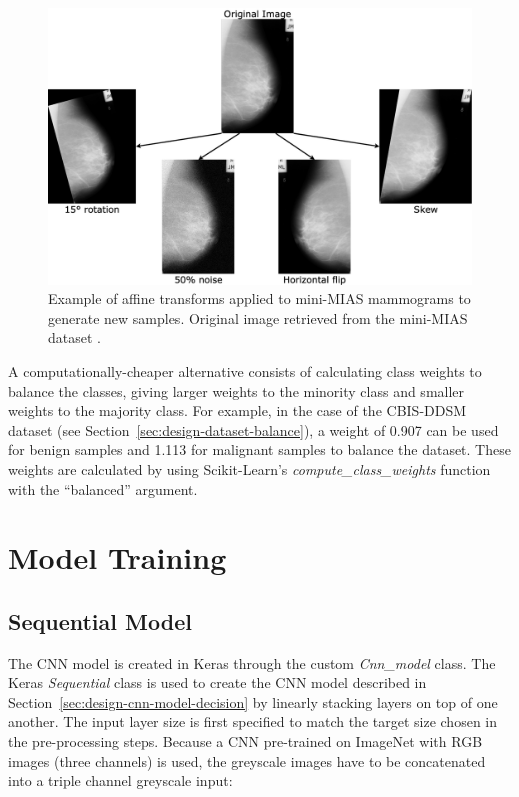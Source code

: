 \begin{figure}[h]
\centerline{\includegraphics[width=\textwidth]{figures/implementation/Data augmentation transforms.png}}
\caption{\label{fig:implementation-Data augmentation transforms}Example of affine transforms applied to mini-MIAS mammograms to generate new samples. Original image retrieved from the mini-MIAS dataset \citep{Suckling1994}.}
\end{figure}

A computationally-cheaper alternative consists of calculating class weights to balance the classes, giving larger weights to the minority class and smaller weights to the majority class. For example, in the case of the CBIS-DDSM dataset (see Section~\ref{sec:design-dataset-balance}), a weight of 0.907 can be used for benign samples and 1.113 for malignant samples to balance the dataset. These weights are calculated by using Scikit-Learn's \textit{compute\_class\_weights} function with the ``balanced'' argument.


\section{Model Training}

\subsection{Sequential Model}
\label{sec:implementation-sequential-cnn-model}

The CNN model is created in Keras through the custom \textit{Cnn\_model} class. The Keras \textit{Sequential} class is used to create the CNN model described in Section~\ref{sec:design-cnn-model-decision} by linearly stacking layers on top of one another. The input layer size is first specified to match the target size chosen in the pre-processing steps. Because a CNN pre-trained on ImageNet with RGB images (three channels) is used, the greyscale images have to be concatenated into a triple channel greyscale input:

